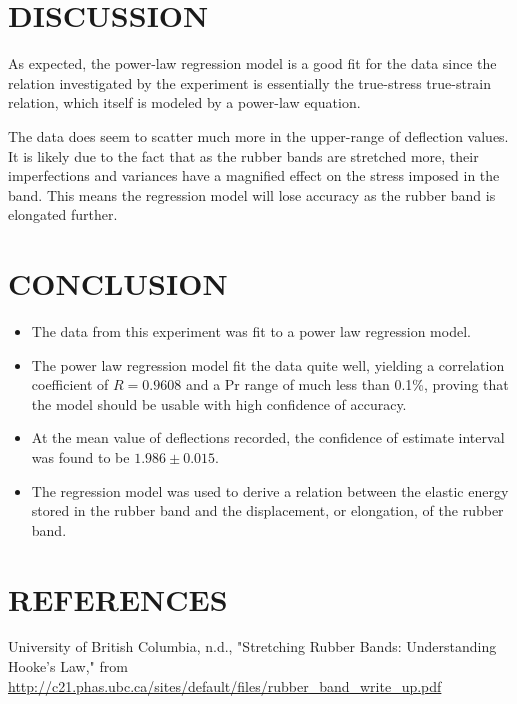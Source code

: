 \documentclass[12pt]{article}
\begin{document}
\bigskip



\section*{\fontsize{12}{12}\selectfont DISCUSSION}
As expected, the power-law regression model is a good fit for the data since the relation investigated by the experiment is essentially the true-stress true-strain relation, which itself is modeled by a power-law equation.
\bigskip

The data does seem to scatter much more in the upper-range of deflection values. It is likely due to the fact that as the rubber bands are stretched more, their imperfections and variances have a magnified effect on the stress imposed in the band. This means the regression model will lose accuracy as the rubber band is elongated further.


\section*{\fontsize{12}{12}\selectfont CONCLUSION}

\begin{itemize}
	\item The data from this experiment was fit to a power law regression model.
	\item The power law regression model fit the data quite well, yielding a correlation coefficient of $R=0.9608$ and a Pr range of much less than 0.1\%, proving that the model should be usable with high confidence of accuracy.
	\item At the mean value of deflections recorded, the confidence of estimate interval was found to be $1.986 \pm 0.015$.
	\item The regression model was used to derive a relation between the elastic energy stored in the rubber band and the displacement, or elongation, of the rubber band.
\end{itemize}

\bigskip


\section*{\fontsize{12}{12}\selectfont REFERENCES}

\begin{thebibliography}{2}

University of British Columbia, n.d., "Stretching Rubber Bands: Understanding Hooke's Law," from
 \url{http://c21.phas.ubc.ca/sites/default/files/rubber_band_write_up.pdf}

\end{thebibliography}


\end{document}
